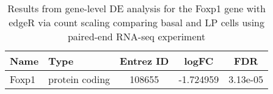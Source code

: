 \begin{table}

\caption{Results from gene-level DE analysis for the Foxp1 gene with edgeR via count scaling comparing basal and LP cells using paired-end RNA-seq experiment}
\centering
\begin{tabular}[t]{llccc}
\toprule
Name & Type & Entrez ID & logFC & FDR\\
\midrule
Foxp1 & protein coding & 108655 & -1.724959 & 3.13e-05\\
\bottomrule
\end{tabular}
\end{table}
